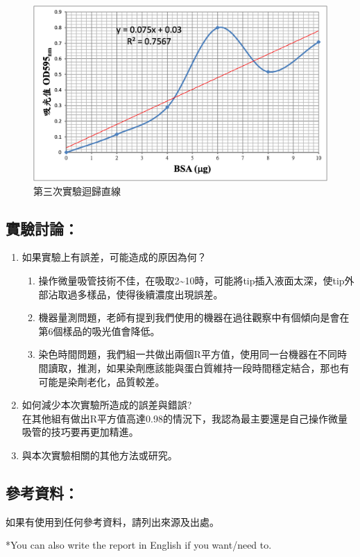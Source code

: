 \begin{figure}[H]\centering
\begin{minipage}[b]{0.4\textwidth} %
\centering
\includegraphics[width=1\textwidth]{paste_src/2023-09-28-17-19-36.png}
\caption{第三次實驗迴歸直線}
\label{}
\end{minipage}
\end{figure}

\subsection*{實驗討論：}

\begin{enumerate}[label=\arabic*.]
  \item 如果實驗上有誤差，可能造成的原因為何？
  \begin{enumerate}[label=(\arabic*)]
    \item 操作微量吸管技術不佳，在吸取2\~{}10\mul 時，可能將tip插入液面太深，使tip外部沾取過多樣品，使得後續濃度出現誤差。
    \item 機器量測問題，老師有提到我們使用的機器在過往觀察中有個傾向是會在第6個樣品的吸光值會降低。
    \item 染色時間問題，我們組一共做出兩個R平方值，使用同一台機器在不同時間讀取，推測，如果染劑應該能與蛋白質維持一段時間穩定結合，那也有可能是染劑老化，品質較差。
  \end{enumerate}

  \item 如何減少本次實驗所造成的誤差與錯誤?\\
  在其他組有做出R平方值高達0.98的情況下，我認為最主要還是自己操作微量吸管的技巧要再更加精進。
  \item 與本次實驗相關的其他方法或研究。

\end{enumerate}


\subsection*{參考資料：}
如果有使用到任何參考資料，請列出來源及出處。

*You can also write the report in English if you want/need to.
